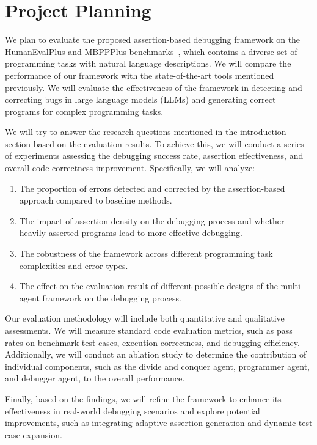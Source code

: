 
\section{Project Planning}

We plan to evaluate the proposed assertion-based debugging framework on the HumanEvalPlus and MBPPPlus benchmarks~\cite{evalplus}, which contains a diverse set of programming tasks with natural language descriptions. We will compare the performance of our framework with the state-of-the-art tools mentioned previously. We will evaluate the effectiveness of the framework in detecting and correcting bugs in large language models (LLMs) and generating correct programs for complex programming tasks.

We will try to answer the research questions mentioned in the introduction section based on the evaluation results. To achieve this, we will conduct a series of experiments assessing the debugging success rate, assertion effectiveness, and overall code correctness improvement. Specifically, we will analyze:

\begin{enumerate}
    \item The proportion of errors detected and corrected by the assertion-based approach compared to baseline methods.
    \item The impact of assertion density on the debugging process and whether heavily-asserted programs lead to more effective debugging.
    \item The robustness of the framework across different programming task complexities and error types.
    \item The effect on the evaluation result of different possible designs of the multi-agent framework on the debugging process.
\end{enumerate}

Our evaluation methodology will include both quantitative and qualitative assessments. We will measure standard code evaluation metrics, such as pass rates on benchmark test cases, execution correctness, and debugging efficiency. Additionally, we will conduct an ablation study to determine the contribution of individual components, such as the divide and conquer agent, programmer agent, and debugger agent, to the overall performance.

Finally, based on the findings, we will refine the framework to enhance its effectiveness in real-world debugging scenarios and explore potential improvements, such as integrating adaptive assertion generation and dynamic test case expansion.